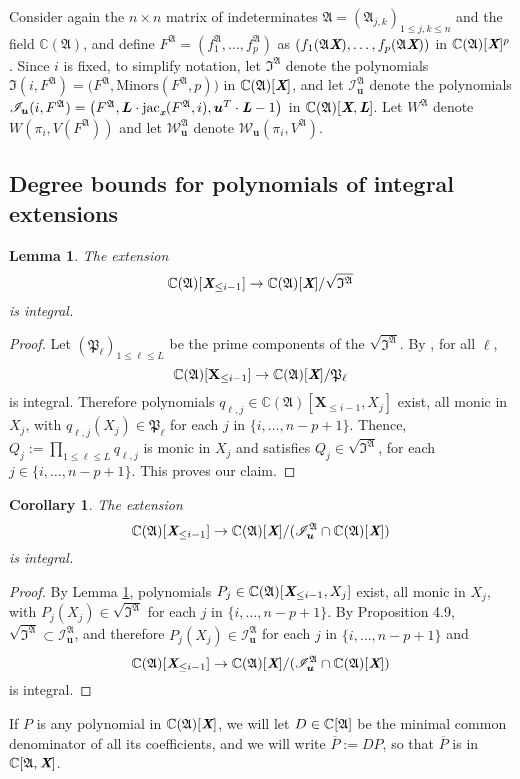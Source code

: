 \documentclass[a4paper]{article}
\def\fA{{\mathfrak A}}
\def\fp{\mathfrak{P}}
\def\A{\mathfrak{A}}
\def\Lb{\textit{\textbf{L}}}
\def\Xb{\textit{\textbf{X}}}
\def\ub{{\bm u}}
\def\xb{\textit{\textbf{x}}}
\DeclareMathOperator{\jac}{jac}
\def\minorsfA{\textrm{Minors}(F^{\A},p)}
\def\C{\mathbb{C}}
\def\I{\mathfrak{I}}
\def\Il{\mathscr{I}_{\ub}}
\def\IilfA{\mathscr{I}_{\ub}(i,F^{\A})}
\def\WilfA{\mathscr{W}_{\ub}(\pi_i,V^{\fA})}
\def\Wl{\mathscr{W}_{\ub}}
\newtheorem{corollary}[theorem]{Corollary}
\newtheorem{lemma}[theorem]{Lemma}
\begin{document}
Consider again the $n\times n$ matrix of indeterminates
$\A=(\A_{j,k})_{1 \le j,k \le n}$ and the field $\C(\A)$,
and define $F^{\A}=(f_1^{\A},\hdots,f_p^{\A})$  as $(f_1(\A\Xb),\hdots,f_p(\A\Xb))$ in $\C(\A)[\Xb]^p$.  Since $i$ is fixed, to
simplify notation, let $\I^\A$ denote the polynomials $\I(i,F^\A)= \big (F^\A, \minorsfA \big )$ in
$\C(\A)[\Xb]$, and let $\Il^\A$ denote the polynomials $\IilfA= \big (F^\A, \bm L \cdot \jac_{\xb}(F^\A,i),\ub^T\cdot\Lb-1 \big )$ in
$\C(\A)[\Xb,\Lb]$. Let $W^\A$ denote  $W(\pi_i,V(F^\A))$ and let $\Wl^\A$ denote  $\WilfA$. 




\subsection{Degree bounds for polynomials of integral extensions} 
%
\begin{lemma}\label{lem:6.1}
 The extension $$\C(\A)[\Xb_{\leq i-1}]\rightarrow
 \C(\A)[\Xb]/\sqrt{\I^{\A}}$$ is integral.
\end{lemma}
%
\begin{proof}
  Let $(\fp_\ell)_{1 \le \ell \leq L}$ be the prime components of
  the $\sqrt{\I^\A}$. By \cite[Proposition 1]{EMP}, for all
  $\ell$,
  \[
    \C(\A)[\textbf{X}_{\leq i-1}]\rightarrow\C(\A)[\Xb]/\fp_\ell
  \] 
  is integral. Therefore polynomials
  $q_{\ell,j}\in\C(\A)[\textbf{X}_{\leq i-1},X_j]$ exist, all monic in
  $X_j$, with $q_{\ell,j}(X_j)\in \fp_\ell$ for each $j$ in
  $\{i,\hdots,n-p+1\}.$ Thence, $ Q_{j} := \prod_{1 \le \ell\le L}
  q_{\ell,j}$ is monic in $X_j$ and satisfies $ Q_{j} \in \sqrt{\I^\A}$, for
  each $j \in \{i,\hdots,n-p+1\}.$ This proves our claim.
\end{proof}
%
\begin{corollary}\label{lem:6.2}
 The extension $$\C(\A)[\Xb_{\leq i-1}]\rightarrow
 \C(\A)[\Xb]/(\Il^{\A} \cap \C(\A)[\Xb])$$ is integral.
\end{corollary}
%
\begin{proof}
By Lemma \ref{lem:6.1}, polynomials
  $P_{j}\in\C(\A)[\Xb_{\leq i-1},X_j]$ exist, all monic in
  $X_j$, with $P_{j}(X_j)\in \sqrt{\I^{\A}}$ for each $j$ in
  $\{i,\hdots,n-p+1\}.$ By Proposition 4.9, $\sqrt{\I^{\A}} \subset \Il^{\A}$, and therefore $P_{j}(X_j)\in \Il^{\A}$ for each $j$ in 
  $\{i,\hdots,n-p+1\}$ and $$\C(\A)[\Xb_{\leq i-1}]\rightarrow
 \C(\A)[\Xb]/(\Il^{\A} \cap \C(\A)[\Xb])$$ is integral.
\end{proof}
%
If $P$ is any polynomial in $\C(\frak A)[\Xb]$, we will let
$D \in \C[\frak A]$ be the minimal common denominator of all its
coefficients, and we will write $\overline P := D P$, so that
$\overline P$ is in $\C[\A,\Xb]$.
\end{document}
